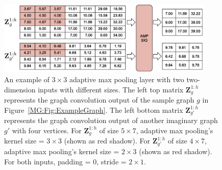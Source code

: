 \begin{figure}[htbp]
\centerline{\includegraphics[width=0.92\textwidth]{Magic/figures/ExampleAmp.eps}}
\caption{An example of $3\times 3$ adaptive max pooling layer with two two-dimension inputs with different sizes.
The left top matrix $\mathbf{Z}^{1:h}_g$ represents the graph convolution output of the sample graph $g$ in Figure~\ref{MG:Fig:ExampleGraph}.
The left bottom matrix $\mathbf{Z}^{1:h}_{g'}$ represents the graph convolution output of another imaginary graph $g'$ with four vertices.
For $\mathbf{Z}^{1:h}_g$ of size $5\times 7$, adaptive max pooling's kernel size = $3 \times 3$ (shown as red shadow).
For $\mathbf{Z}^{1:h}_{g'}$ of size $4\times 7$, adaptive max pooling's kernel size = $2 \times 3$ (shown as red shadow).
For both inputs, padding = 0, stride = $2 \times 1$.}
\label{MG:Fig:ExampleAmp}
\end{figure}

